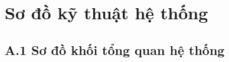 \chapter{Sơ đồ kỹ thuật hệ thống}
\label{app:schematic}


\section*{A.1 \quad Sơ đồ khối tổng quan hệ thống}

